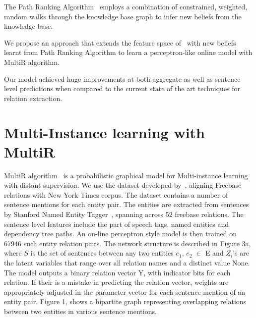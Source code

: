 \documentclass[11pt,a4paper]{article}
\begin{document}
The Path Ranking Algorithm~\cite{lao-2010-pra} employs a combination of
constrained, weighted, random walks through the knowledge base graph to infer
new beliefs from the knowledge base.

We propose an approach that extends the feature space
of~\cite{riedel-2010-distant-supervision} with new beliefs learnt from Path
Ranking Algorithm to learn a perceptron-like online model with MultiR
algorithm.

Our model achieved huge improvements at both aggregate as well as sentence
level predictions when compared to the current state of the art techniques for
relation extraction.

\section{Multi-Instance learning with MultiR}

MultiR algorithm~\cite{hoffmann-2011-distant-supervision} is a probabilistic
graphical model for Multi-instance learning with distant supervision. We use
the dataset developed by~\cite{riedel-2010-distant-supervision}, aligning
Freebase relations with New York Times corpus.  The dataset contains a number
of sentence mentions for each entity pair. The entities are extracted from
sentences by Stanford Named Entity Tagger~\cite{finkel-2005-non-local-ie},
spanning across 52 freebase relations. The sentence level features include the
part of speech tags, named entities and dependency tree paths. An on-line
perceptron style model is then trained on 67946 such entity relation pairs. The
network structure is described in Figure 3a, where $S$ is the set of sentences
between any two entities $e_1$, $e_2$ $\in$ E and $Z_i$'s are the latent
variables that range over all relation names and a distinct value None. The
model outputs a binary relation vector Y, with indicator bits for each
relation. If their is a mistake in predicting the relation vector, weights are
appropriately adjusted in the parameter vector for each sentence mention of an
entity pair. Figure 1, shows a bipartite graph representing overlapping
relations between two entities in various sentence mentions.
\end{document}
